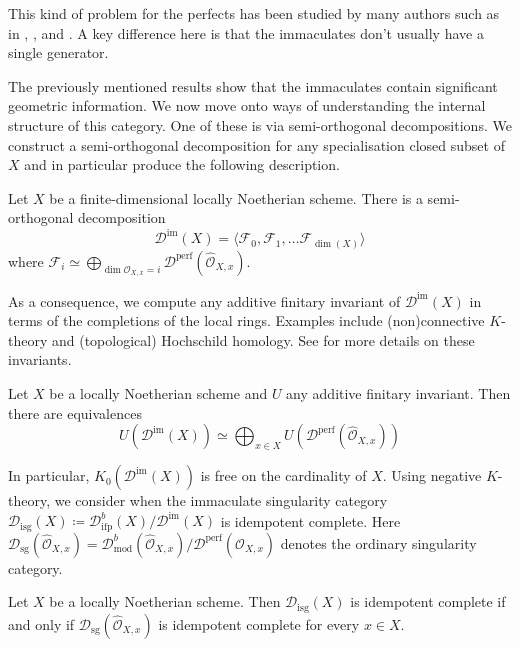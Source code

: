 \documentclass[12pt,oneside]{amsart}
\DeclareMathOperator{\fdmod}{mod}
\DeclareMathOperator{\perf}{perf}
\DeclareMathOperator{\immac}{im}
\DeclareMathOperator{\ifp}{ifp}
\DeclareMathOperator{\sg}{sg}
\DeclareMathOperator{\isg}{isg}
\begin{document}
This kind of problem for the perfects has been studied by many authors such as in \cite{Ric89}, \cite{Nee25}, \cite{KS22} and \cite{Kra20}. A key difference here is that the immaculates don't usually have a single generator.

The previously mentioned results show that the immaculates contain significant geometric information. We now move onto ways of understanding the internal structure of this category. One of these is via semi-orthogonal decompositions. We construct a semi-orthogonal decomposition for any specialisation closed subset of $X$ and in particular produce the following description. 

\begin{theorem}
Let $X$ be a finite-dimensional locally Noetherian scheme. There is a semi-orthogonal decomposition
\[
\mathcal{D}^{\immac}(X) = \langle \mathcal{F}_0, \mathcal{F}_1,\dots \mathcal{F}_{\dim(X)} \rangle
\]
where $\mathcal{F}_i \simeq \bigoplus_{\dim \mathcal{O}_{X,x} = i }\mathcal{D}^{\perf}(\widehat{\mathcal{O}}_{X,x})$.
\end{theorem}

As a consequence, we compute any additive finitary invariant of $\mathcal{D}^{\immac}(X)$ in terms of the completions of the local rings. Examples include (non)connective $K$-theory and (topological) Hochschild homology. See \cite{BGT13} for more details on these invariants. 


\begin{theorem} \label{introKthy}
Let $X$ be a locally Noetherian scheme and $U$ any additive finitary invariant. Then there are equivalences
\[
U(\mathcal{D}^{\immac}(X)) \simeq \bigoplus_{x \in X} U(\mathcal{D}^{\perf}(\widehat{\mathcal{O}}_{X,x}))
\]

\end{theorem}

In particular, $K_0(\mathcal{D}^{\immac}(X))$ is free on the cardinality of $X$. Using negative $K$-theory, we consider when the immaculate singularity category $\mathcal{D}_{\isg}(X) \coloneq \mathcal{D}^b_{\ifp}(X)/ \mathcal{D}^{\immac}(X)$ is idempotent complete. Here $\mathcal{D}_{\sg}(\widehat{\mathcal{O}}_{X,x}) = \mathcal{D}^b_{\fdmod}(\widehat{\mathcal{O}}_{X,x})/\mathcal{D}^{\perf}(\widehat{\mathcal{O}}_{X,x})$ denotes the ordinary singularity category.

\begin{cor}
Let $X$ be a locally Noetherian scheme. Then $\mathcal{D}_{\isg}(X)$ is idempotent complete if and only if $\mathcal{D}_{\sg}(\widehat{\mathcal{O}}_{X,x})$ is idempotent complete for every $x \in X$. 
\end{cor}
\end{document}
